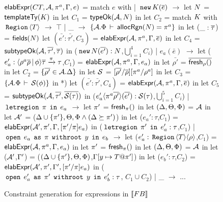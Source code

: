 \begin{figure}

\begin{codeml}
${\sf elabExpr}(CT, {\mathcal{A}}, \pi^a, \Gamma, e)$ = 
  match $e$ with
  | $\,{\tt new}\, K(\overline{e})$ $\longrightarrow$ 
    let $N$ = ${\sf templateTy}(K)$ in
    let $C_1$ = ${\sf typeOk}({{\mathcal{A}}},{N})$ in
    let $C_2$ = match $K$ with $\,{\tt Region}\,\langle T \rangle$ $\longrightarrow$ $\top$
          | _ $\longrightarrow$ $\{{\mathcal{A}}.\Phi\,\vdash\,{\sf allocRgn}(N)=\pi^a\}$ in
    let ($\_:\overline{\tau}$) = ${\sf fields}(N)$
    let $(\bar{e'}:\bar{\tau'}, C_3)$ = ${\sf elabExpr}({\mathcal{A}},\pi^a,\Gamma,\overline{e})$ in
    let $C_4$ = ${\sf subtypeOk}({{\mathcal{A}}},{\overline{\tau'}},{\overline{\tau}})$ in
      ($\,{\tt new}\, N(\overline{e'}) : N$,$\bigcup_{i=1}^4 C_i$)
  | $e_a(\bar{e})$ $\longrightarrow$ 
    let ($e_a':\langle \rho^a\overline{\rho}\,|\,\phi \rangle\overline{\tau} \xrightarrow{\pi} \tau$,$C_1$) = 
                ${\sf elabExpr}({\mathcal{A}},\pi^a,\Gamma,e_a)$ in
    let $\bar{\rho'}$ = $\overline{{\sf fresh}_\rho()}$ in
    let $C_2$ = $\{\overline{\rho'} \in {\mathcal{A}}.\Delta\}$ in
    let $\mathcal{S}$ = $[\overline{\rho'}/\overline{\rho}][\pi^a/\rho^a]$ in
    let $C_3$ = $\{{\mathcal{A}}.\Phi\,\vdash\,\mathcal{S}(\phi)\}$ in
*)   let $(\bar{e'}:\bar{\tau'}, C_4)$ = ${\sf elabExpr}({\mathcal{A}},\pi^a,\Gamma,\overline{e})$ in
    let $C_5$ = ${\sf subtypeOk}({{\mathcal{A}}},{\overline{\tau'}},{\overline{\mathcal{S}(\tau)}})$ in
      ($e_a'\langle \pi^a\overline{\rho'} \rangle(\overline{e'}):\mathcal{S}(\tau)$,$\bigcup_{i=1}^5 C_i$)
  | $\,{\tt letregion}\,\;\pi\;\,{\tt in}\,\;e_a$ $\longrightarrow$
    let $\pi'$ = ${\sf fresh}_{\pi}()$ in 
    let $(\Delta,\Theta,\Phi)$ = ${\mathcal{A}}$ in
    let ${\mathcal{A}}'$ = ($\Delta \cup \{\pi'\}, \Theta, \Phi \wedge (\Delta \succeq \pi')$) in
    let ($e_a':\tau$,$C_1$) = ${\sf elabExpr}({\mathcal{A}}',\pi',\Gamma,[\pi'/\pi]e_a)$ in
      ($\,{\tt letregion}\,\;\pi'\;\,{\tt in}\,\;e_a':\tau$,$C_1$)
  | $\,{\tt open}\,\;e_a\;\,{\tt as}\,\;\pi\;\,{\tt withroot}\,\;y\;\,{\tt in}\,\;e_b$ $\longrightarrow$ 
    let ($e_a':\,{\tt Region}\,\langle T \rangle\langle \rho \rangle$,$C_1$) = 
                ${\sf elabExpr}({\mathcal{A}},\pi^a,\Gamma,e_a)$ in
    let $\pi'$ = ${\sf fresh}_{\pi}()$ in 
    let $(\Delta,\Theta,\Phi)$ = ${\mathcal{A}}$ in
    let (${\mathcal{A}}'$,$\Gamma'$) = ($(\Delta \cup \{\pi'\},\Theta,\Phi)$,$\Gamma[y\mapsto T@\pi']$) in
    let ($e_b':\tau$,$C_2$) = ${\sf elabExpr}({\mathcal{A}}',\pi',\Gamma',[\pi'/\pi]e_a)$ in
      ($\,{\tt open}\,\;e_a'\;\,{\tt as}\,\;\pi'\;\,{\tt withroot}\,\;y\;\,{\tt in}\,\;e_b' : \tau$, $C_1 \cup C_2$)
  | _ $\longrightarrow$ ...
\end{codeml}

\caption{Constraint generation for expressions in $\llbracket {\sc FB} \rrbracket$}
\label{fig:fb-elabexpr}
\end{figure}
